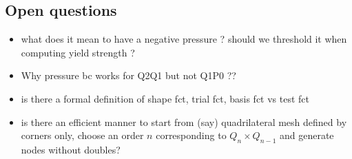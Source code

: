 \subsection{Open questions}

\begin{itemize}
\item what does it mean to have a negative pressure ? should we threshold it when computing yield strength ? 
\item Why pressure bc works for Q2Q1 but not Q1P0 ??
\item is there a formal definition of shape fct, trial fct, basis fct vs test fct 
\item is there an efficient manner to start from (say) quadrilateral mesh defined by corners only, choose an 
order $n$ corresponding to $Q_n \times Q_{n-1}$ and generate nodes without doubles?
\end{itemize}





